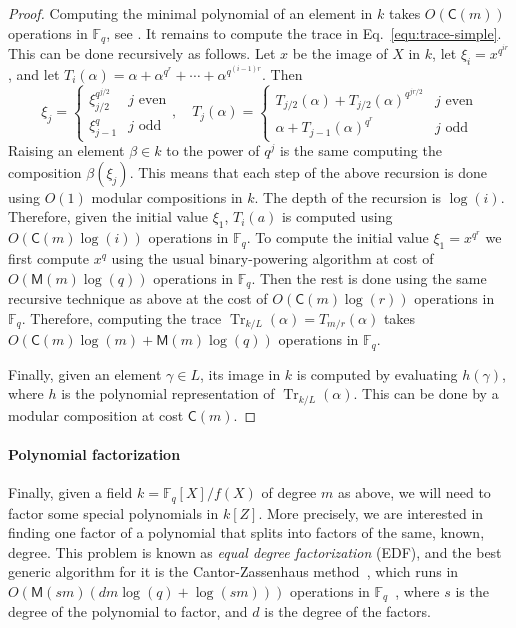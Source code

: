 \documentclass[12pt]{article}
\theoremstyle{plain}
\theoremstyle{definition}
\DeclareMathOperator{\trace}{Tr} %
\def\F{\ensuremath{\mathbb{F}}}
\def\MM{\ensuremath{\mathsf{M}}}
\def\CC{\ensuremath{\mathsf{C}}}
\newcounter{algorithm}
\begin{document}
\begin{proof}
	Computing the minimal polynomial of an element in $k$ takes $O(\CC(m))$ operations in $\F_q$, 
	see \cite{shoup93}. It remains to compute the trace in Eq.~\eqref{equ:trace-simple}. This can be done 
	recursively as follows. Let $x$ be the image of $X$ in $k$,
        let $\xi_i = x^{q^{ir}}$, and let $T_i(\alpha) = \alpha + \alpha^{q^r} + \cdots + \alpha^{q^{(i - 1)r}}$. Then
	\[
	\xi_j = 
	\begin{cases}
	\xi_{j / 2}^{q^{j / 2}} & j \text{ even} \\
	\xi_{j - 1}^q & j \text{ odd}
	\end{cases}, \quad
	T_j(\alpha) = 
	\begin{cases}
	T_{j / 2}(\alpha) + T_{j / 2}(\alpha)^{q^{jr/2}} & j \text{ even} \\
	\alpha + T_{j - 1}(\alpha)^{q^r} & j \text{ odd}
	\end{cases}
	\]
	Raising an element $\beta \in k$ to the power of $q^j$ is the same computing the composition 
	$\beta(\xi_j)$. This means that each step of the above recursion is done using $O(1)$ modular 
	compositions in $k$. The depth of the recursion is $\log(i)$. Therefore, given the initial value 
	$\xi_1$, $T_i(a)$ is computed using $O(\CC(m)\log(i))$ operations in $\F_q$. To compute the 
	initial value $\xi_1 = x^{q^r}$ we first compute $x^q$ using the usual binary-powering 
	algorithm at cost of $O(\MM(m)\log(q))$ operations in $\F_q$. Then the rest is done using the 
	same recursive technique as above at the cost of $O(\CC(m)\log(r))$ operations in $\F_q$. 
	Therefore, computing the trace $\trace_{k/L}(\alpha) = T_{m/r}(\alpha)$ takes $O(\CC(m)\log(m) + 
	\MM(m)\log(q))$ operations in $\F_q$.

        Finally, given an element $\gamma\in L$, its image in $k$ is
        computed by evaluating $h(\gamma)$, where $h$ is the
        polynomial representation of $\trace_{k/L}(\alpha)$. This can
        be done by a modular composition at cost $\CC(m)$.
\end{proof}


\paragraph{Polynomial factorization}
Finally, given a field $k = \F_q[X]/f(X)$ of degree $m$ as above, we will need to
factor some special polynomials in $k[Z]$. More precisely, we are
interested in finding one factor of a polynomial that splits into
factors of the same, known, degree. This problem is known as
\emph{equal degree factorization} (EDF), and the best generic algorithm for
it is the Cantor-Zassenhaus method~\cite{cantor1981,von1992computing},
which runs in $O(\MM(sm)(dm\log(q) + \log(sm)))$ operations in
$\F_q$~\cite[Th.~14.9]{vzGG}, where $s$ is the degree of the
polynomial to factor, and $d$ is the degree of the factors.
\end{document}
